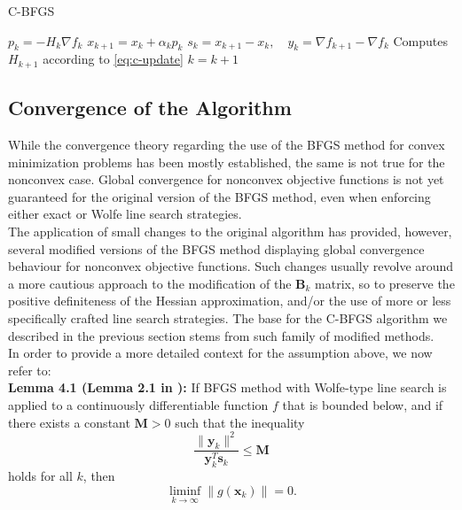 \documentclass{article}
\numberwithin{equation}{section}
\begin{document}
\begin{algorithm}
\caption{C-BFGS}\label{alg:c_bfgs}
\begin{algorithmic}

        \State $p_k=-H_k \nabla f_k$ 
        \State $x_{k+1}=x_k + \alpha_k p_k$
        \State $s_k = x_{k+1} - x_k, \quad y_k = \nabla f_{k+1} - \nabla f_k$
        \State Computes $H_{k+1}$ according to \ref{eq:c-update}
        \State $ k = k + 1$
    \EndWhile
\EndProcedure
\end{algorithmic}
\end{algorithm}

\subsection{Convergence of the Algorithm}
While the convergence theory regarding the use of the BFGS method for convex minimization problems has been mostly established, the same is not true for the nonconvex case. Global convergence for nonconvex objective functions is not yet guaranteed for the original version of the BFGS method, even when enforcing either exact\cite{Mascarenhas} or Wolfe\cite{Dai} line search strategies. 
\\

The application of small changes to the original algorithm has provided, however, several modified versions of the BFGS method displaying global convergence behaviour for nonconvex objective functions. Such changes usually revolve around a more cautious approach to the modification of the $\boldsymbol{B}_k$ matrix, so to preserve the positive definiteness of the Hessian approximation, and/or the use of more or less specifically crafted line search strategies\cite{LiFukushimaB}\cite{Yuan}\cite{LiLuFeng}. The base for the C-BFGS algorithm\cite{LiFukushimaA} we described in the previous section stems from such family of modified methods. 
\\

In order to provide a more detailed context for the assumption above, we now refer to:\\
\textbf{Lemma 4.1 (Lemma 2.1 in \cite{LiFukushimaA}):} If BFGS method with Wolfe-type line search is applied to a continuously differentiable function $f$ that is bounded below, and if there exists a constant $\boldsymbol{M}>0$ such that the inequality 
\begin{equation}\label{eq:bfgs_inequality}
    \frac{\|\boldsymbol{y}_k\|^2}{\boldsymbol{y}_k^T \boldsymbol{s}_k} \le \boldsymbol{M}
\end{equation}
holds for all $k$, then
\begin{equation}
    \liminf_{k \rightarrow\infty} \| g(\boldsymbol{x}_k) \| =0.
\end{equation}
 
\end{document}
